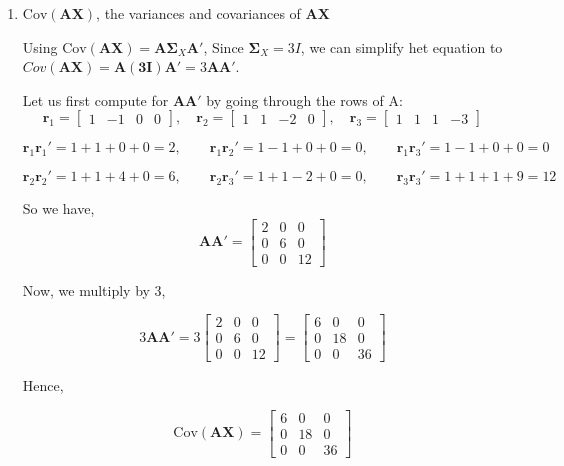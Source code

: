 \documentclass[12pt]{article}
\begin{document}
\begin{enumerate}
\item[(b)] $\text{Cov}(\mathbf{A}\mathbf{X})$, the variances and covariances of $\mathbf{A}\mathbf{X}$

\vspace{0.5em}

\noindent Using $\text{Cov}(\mathbf{A}\mathbf{X}) = \mathbf{A}\boldsymbol{\Sigma}_X\mathbf{A}'$, Since $\boldsymbol{\Sigma}_X = 3I$, we can simplify het equation to ${Cov}(\mathbf{A}\mathbf{X}) = \mathbf{A}\mathbf{(3I)}\mathbf{A}'= 3\mathbf{A}\mathbf{A}'$.

\noindent Let us first compute for $\mathbf{A}\mathbf{A}'$ by going through the rows of A:
$$
\mathbf{r}_1 = \begin{bmatrix} 1 & -1 & 0 & 0 \end{bmatrix}, \quad
\mathbf{r}_2 = \begin{bmatrix} 1 & 1 & -2 & 0 \end{bmatrix}, \quad
\mathbf{r}_3 = \begin{bmatrix} 1 & 1 & 1 & -3 \end{bmatrix}
$$

$$
\mathbf{r}_1\mathbf{r}_1' = 1+1+0+0 = 2, \qquad
\mathbf{r}_1\mathbf{r}_2' = 1-1+0+0 = 0, \qquad
\mathbf{r}_1\mathbf{r}_3' = 1-1+0+0 = 0
$$

$$
\mathbf{r}_2\mathbf{r}_2' = 1+1+4+0 = 6, \qquad
\mathbf{r}_2\mathbf{r}_3' = 1+1-2+0 = 0, \qquad
\mathbf{r}_3\mathbf{r}_3' = 1+1+1+9 = 12
$$

\noindent So we have,
$$
\mathbf{A}\mathbf{A}' = \begin{bmatrix} 2 & 0 & 0 \\ 0 & 6 & 0 \\ 0 & 0 & 12 \end{bmatrix}
$$

\noindent Now, we multiply by 3,

$$
3\mathbf{A}\mathbf{A}' = 3\begin{bmatrix} 2 & 0 & 0 \\ 0 & 6 & 0 \\ 0 & 0 & 12 \end{bmatrix} 
= \begin{bmatrix} 6 & 0 & 0 \\ 0 & 18 & 0 \\ 0 & 0 & 36 \end{bmatrix}
$$

Hence,

$$
\boxed{
\text{Cov}(\mathbf{A}\mathbf{X}) = \begin{bmatrix} 6 & 0 & 0 \\ 0 & 18 & 0 \\ 0 & 0 & 36 \end{bmatrix}
}
$$


\end{enumerate}
\end{document}
